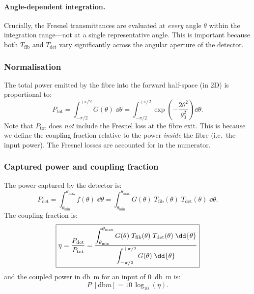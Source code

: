 \paragraph{Angle-dependent integration.}
Crucially, the Fresnel transmittances are evaluated at \emph{every}
angle $\theta$ within the integration range---not at a single
representative angle.  This is important because both $T_\text{fib}$
and $T_\text{det}$ vary significantly across the angular aperture of
the detector.

\subsubsection{Normalisation}

The total power emitted by the fibre into the forward half-space
(in 2D) is proportional to:
%
\begin{equation}\label{eq:Ptot}
  P_\text{tot} = \int_{-\pi/2}^{+\pi/2}
    G(\theta)\;\dd{\theta}
  = \int_{-\pi/2}^{+\pi/2}
    \exp\!\left(-\frac{2\theta^2}{\theta_0^2}\right)\dd{\theta}.
\end{equation}
%
Note that $P_\text{tot}$ does \emph{not} include the Fresnel loss at
the fibre exit.  This is because we define the coupling fraction
relative to the power \emph{inside} the fibre (i.e.\ the input power).
The Fresnel losses are accounted for in the numerator.

\subsubsection{Captured power and coupling fraction}

The power captured by the detector is:
%
\begin{equation}\label{eq:Pdet}
  P_\text{det} = \int_{\theta_\text{min}}^{\theta_\text{max}}
    f(\theta)\;\dd{\theta}
  = \int_{\theta_\text{min}}^{\theta_\text{max}}
    G(\theta)\;T_\text{fib}(\theta)\;T_\text{det}(\theta)\;\dd{\theta}.
\end{equation}
%
The coupling fraction is:
%
\begin{equation}\label{eq:eta}
  \boxed{%
    \eta = \frac{P_\text{det}}{P_\text{tot}}
         = \frac{\displaystyle
           \int_{\theta_\text{min}}^{\theta_\text{max}}
           G(\theta)\;T_\text{fib}(\theta)\;T_\text{det}(\theta)
           \;\dd{\theta}}
           {\displaystyle
           \int_{-\pi/2}^{+\pi/2}
           G(\theta)\;\dd{\theta}}
  }
\end{equation}
%
and the coupled power in \si{\decibel m} for an input of \SI{0}{\decibel m}
is:
%
\begin{equation}\label{eq:dBm}
  P\;[\si{\decibel m}] = 10\,\log_{10}(\eta).
\end{equation}

